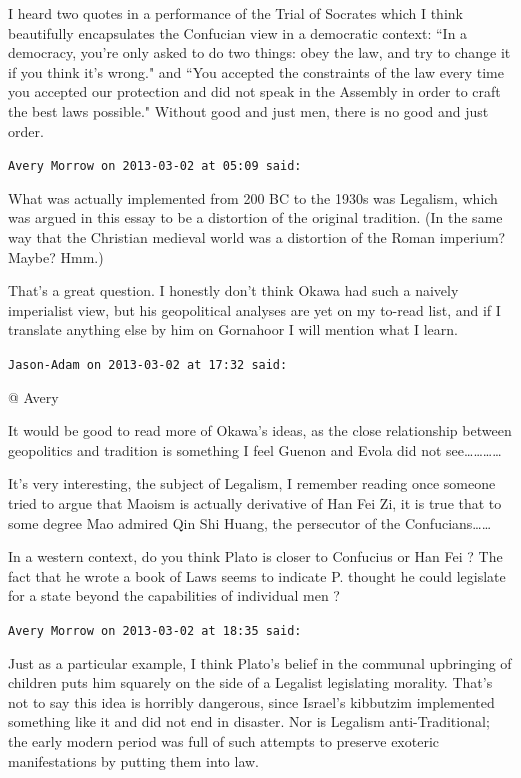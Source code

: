 \begin{footnotesize}
\begin{sffamily}
I heard two quotes in a performance of the Trial of Socrates which I think beautifully encapsulates the Confucian view in a democratic context: ``In a democracy, you're only asked to do two things: obey the law, and try to change it if you think it's wrong." and ``You accepted the constraints of the law every time you accepted our protection and did not speak in the Assembly in order to craft the best laws possible." Without good and just men, there is no good and just order.


\hfill

\texttt{Avery Morrow on 2013-03-02 at 05:09 said: }

What was actually implemented from 200 BC to the 1930s was Legalism, which was argued in this essay to be a distortion of the original tradition. (In the same way that the Christian medieval world was a distortion of the Roman imperium? Maybe? Hmm.)

That's a great question. I honestly don't think Okawa had such a naively imperialist view, but his geopolitical analyses are yet on my to-read list, and if I translate anything else by him on Gornahoor I will mention what I learn.


\hfill

\texttt{Jason-Adam on 2013-03-02 at 17:32 said: }

@ Avery

It would be good to read more of Okawa's ideas, as the close relationship between geopolitics and tradition is something I feel Guenon and Evola did not see…………

It's very interesting, the subject of Legalism, I remember reading once someone tried to argue that Maoism is actually derivative of Han Fei Zi, it is true that to some degree Mao admired Qin Shi Huang, the persecutor of the Confucians…… 

In a western context, do you think Plato is closer to Confucius or Han Fei ? The fact that he wrote a book of Laws seems to indicate P. thought he could legislate for a state beyond the capabilities of individual men ?


\hfill

\texttt{Avery Morrow on 2013-03-02 at 18:35 said: }

Just as a particular example, I think Plato's belief in the communal upbringing of children puts him squarely on the side of a Legalist legislating morality. That's not to say this idea is horribly dangerous, since Israel's kibbutzim implemented something like it and did not end in disaster. Nor is Legalism anti-Traditional; the early modern period was full of such attempts to preserve exoteric manifestations by putting them into law.


\end{sffamily}
\end{footnotesize}
